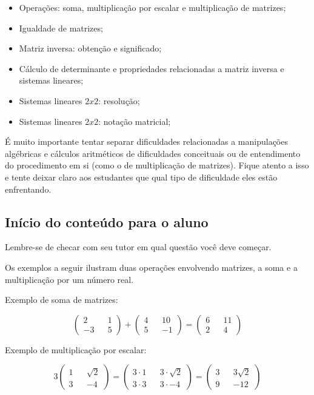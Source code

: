 \documentclass[main_estudante.tex]{subfiles}
\begin{document}
\begin{itemize}
 \item Operações: soma, multiplicação por escalar e multiplicação de matrizes;
 \item Igualdade de matrizes;
 \item Matriz inversa: obtenção e significado;
 \item Cálculo de determinante e propriedades relacionadas a matriz inversa e sistemas lineares;
 \item Sistemas lineares $2x2$: resolução;
 \item Sistemas lineares $2x2$: notação matricial;
\end{itemize}

É muito importante tentar separar dificuldades relacionadas a manipulações algébricas e cálculos aritméticos de dificuldades conceituais ou de entendimento do procedimento em si (como o de multiplicação de matrizes). Fique atento a isso e tente deixar claro aos estudantes que qual tipo de dificuldade eles estão enfrentando.

\subsection{Início do conteúdo para o aluno}

\paraAmbos

Lembre-se de checar com seu tutor em qual questão você deve começar.

Os exemplos a seguir ilustram duas operações envolvendo matrizes, a soma e a multiplicação por um número real.

\begin{caixaExemplo}
	Exemplo de soma de matrizes:

  $$\begin{pmatrix} 2 && 1 \\ -3 && 5 \end{pmatrix} + \begin{pmatrix} 4 && 10 \\ 5 && -1 \end{pmatrix} = \begin{pmatrix} 6 && 11 \\ 2 && 4  \end{pmatrix}$$
\end{caixaExemplo} 	

\begin{caixaExemplo}
	Exemplo de multiplicação por escalar:
 
 $$3 \begin{pmatrix} 1 && \sqrt{2} \\ 3 && -4 \end{pmatrix} = \begin{pmatrix} 3 \cdot 1 && 3 \cdot \sqrt{2} \\ 3 \cdot 3 && 3 \cdot -4 \end{pmatrix} = \begin{pmatrix} 3 && 3 \sqrt{2} \\ 9 && -12 \end{pmatrix}$$
\end{caixaExemplo}
\end{document}
